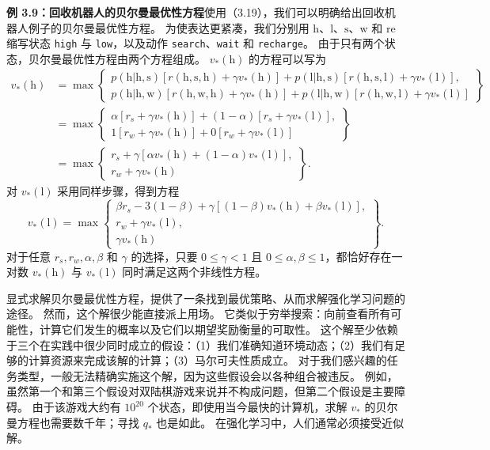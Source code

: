 \documentclass[UTF8, 12pt, fontset=fandol, oneside]{ctexart}
\begin{document}
\noindent\textbf{例 3.9：回收机器人的贝尔曼最优性方程}\quad 使用（3.19），我们可以明确给出回收机器人例子的贝尔曼最优性方程。
为使表达更紧凑，我们分别用 $\mathrm{h}$、$\mathrm{l}$、$\mathrm{s}$、$\mathrm{w}$ 和 $\mathrm{re}$ 缩写状态 \texttt{high} 与 \texttt{low}，以及动作 \texttt{search}、\texttt{wait} 和 \texttt{recharge}。
由于只有两个状态，贝尔曼最优性方程由两个方程组成。
$v_*(\mathrm{h})$ 的方程可以写为
\[
\begin{aligned}
v_*(\mathrm{h})
&=\max\left\{
\begin{array}{l}
p(\mathrm{h}|\mathrm{h},\mathrm{s})[r(\mathrm{h},\mathrm{s},\mathrm{h})+\gamma v_*(\mathrm{h})]
+p(\mathrm{l}|\mathrm{h},\mathrm{s})[r(\mathrm{h},\mathrm{s},\mathrm{l})+\gamma v_*(\mathrm{l})],\\
p(\mathrm{h}|\mathrm{h},\mathrm{w})[r(\mathrm{h},\mathrm{w},\mathrm{h})+\gamma v_*(\mathrm{h})]
+p(\mathrm{l}|\mathrm{h},\mathrm{w})[r(\mathrm{h},\mathrm{w},\mathrm{l})+\gamma v_*(\mathrm{l})]
\end{array}
\right\}\\
&=\max\left\{
\begin{array}{l}
\alpha[r_s+\gamma v_*(\mathrm{h})]+(1-\alpha)[r_s+\gamma v_*(\mathrm{l})],\\
1[r_w+\gamma v_*(\mathrm{h})]+0[r_w+\gamma v_*(\mathrm{l})]
\end{array}
\right\}\\
&=\max\left\{
\begin{array}{l}
r_s+\gamma[\alpha v_*(\mathrm{h})+(1-\alpha)v_*(\mathrm{l})],\\
r_w+\gamma v_*(\mathrm{h})
\end{array}
\right\}.
\end{aligned}
\]
对 $v_*(\mathrm{l})$ 采用同样步骤，得到方程
\[
v_*(\mathrm{l})=\max\left\{
\begin{array}{l}
\beta r_s-3(1-\beta)+\gamma[(1-\beta)v_*(\mathrm{h})+\beta v_*(\mathrm{l})],\\
r_w+\gamma v_*(\mathrm{l}),\\
\gamma v_*(\mathrm{h})
\end{array}
\right\}.
\]
对于任意 $r_s,r_w,\alpha,\beta$ 和 $\gamma$ 的选择，只要 $0\leq\gamma<1$ 且 $0\leq\alpha,\beta\leq1$，都恰好存在一对数 $v_*(\mathrm{h})$ 与 $v_*(\mathrm{l})$ 同时满足这两个非线性方程。

显式求解贝尔曼最优性方程，提供了一条找到最优策略、从而求解强化学习问题的途径。
然而，这个解很少能直接派上用场。
它类似于穷举搜索：向前查看所有可能性，计算它们发生的概率以及它们以期望奖励衡量的可取性。
这个解至少依赖于三个在实践中很少同时成立的假设：（1）我们准确知道环境动态；（2）我们有足够的计算资源来完成该解的计算；（3）马尔可夫性质成立。
对于我们感兴趣的任务类型，一般无法精确实施这个解，因为这些假设会以各种组合被违反。
例如，虽然第一个和第三个假设对双陆棋游戏来说并不构成问题，但第二个假设是主要障碍。
由于该游戏大约有 $10^{20}$ 个状态，即使用当今最快的计算机，求解 $v_*$ 的贝尔曼方程也需要数千年；寻找 $q_*$ 也是如此。
在强化学习中，人们通常必须接受近似解。
\end{document}
